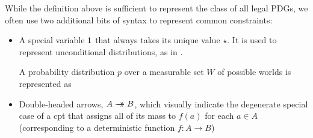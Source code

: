 \documentclass{article}
\newcommand{\doubleheadrightarrow}{%
	\rightarrow\mathrel{\mspace{-15mu}}\rightarrow}
\newcommand{\MN}{PDG}
\newcommand{\MNs}{\MN s}
\numberwithin{equation}{section}
\begin{document}
	While the definition above is sufficient to represent the class of all legal \MNs,
	we often use two additional bits of syntax to represent common constraints:  
	\begin{itemize}
		\item A special variable $\sf 1$ that always takes its unique value $\star$. It is used to represent unconditional distributions, as in . 
	  \begin{vfull}
		\begin{examplex}\label{ex:worldsonly}
			A probability distribution $p$ over a measurable set $W$ of possible worlds is represented as 
			\begin{center}
			\end{center}
		\end{examplex}
		\end{vfull}
		\item Double-headed arrows, $A \doubleheadrightarrow B$, which visually indicate the degenerate special case of a cpt that assigns all of its mass to $f(a)$ for each $a \in A$ (corresponding to a deterministic function $f : A \to B$)
	\end{itemize}
\end{document}

